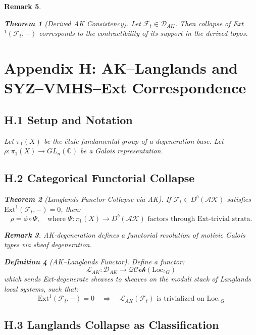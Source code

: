 \documentclass[11pt]{article}
\newtheorem{theorem}{Theorem}[section]
\newtheorem{definition}[theorem]{Definition}
\newtheorem{remark}[theorem]{Remark}
\begin{document}
\begin{remark}
\begin{theorem}[Derived AK Consistency]
Let \( \mathcal{F}_t \in \mathcal{D}_{AK} \). Then collapse of Ext$^1(\mathcal{F}_t, -)$ corresponds to the contractibility of its support in the derived topos.
\end{theorem}


\section*{Appendix H: AK–Langlands and SYZ–VMHS–Ext Correspondence}

\subsection*{H.1 Setup and Notation}
Let $\pi_1(X)$ be the étale fundamental group of a degeneration base. Let $\rho: \pi_1(X) \to GL_n(\mathbb{C})$ be a Galois representation.

\subsection*{H.2 Categorical Functorial Collapse}

\begin{theorem}[Langlands Functor Collapse via AK]
If $\mathcal{F}_t \in D^b(\mathcal{AK})$ satisfies $\mathrm{Ext}^1(\mathcal{F}_t, -) = 0$, then:
\[
\rho = \phi \circ \Psi, \quad \text{where } \Psi: \pi_1(X) \to D^b(\mathcal{AK}) \text{ factors through Ext-trivial strata.}
\]
\end{theorem}

\begin{remark}
AK-degeneration defines a functorial resolution of motivic Galois types via sheaf degeneration.
\end{remark}

\begin{definition}[AK–Langlands Functor]
Define a functor:
\[
\mathcal{L}_{AK} : \mathcal{D}_{AK} \longrightarrow \mathcal{QCoh}(\mathrm{Loc}_{^LG})
\]
which sends Ext-degenerate sheaves to sheaves on the moduli stack of Langlands local systems, such that:
\[
\mathrm{Ext}^1(\mathcal{F}_t, -) = 0 \quad \Rightarrow \quad \mathcal{L}_{AK}(\mathcal{F}_t) \text{ is trivialized on } \mathrm{Loc}_{^LG}
\]
\end{definition}

\subsection*{H.3 Langlands Collapse as Classification}


\end{remark}
\end{document}
